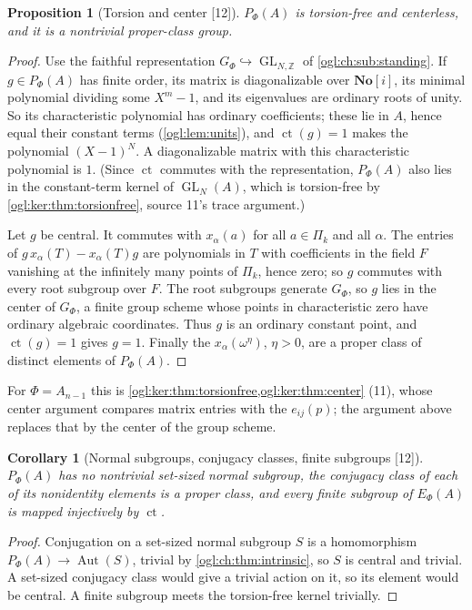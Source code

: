 \documentclass[11pt,oneside]{article}
\numberwithin{equation}{section}
\newtheorem{proposition}[proposition]{Proposition}
\newtheorem{corollary}[corollary]{Corollary}
\theoremstyle{definition}
\theoremstyle{remark}
\newcommand{\No}{\mathbf{No}}
\newcommand{\SC}{\No[i]}
\newcommand{\Z}{\mathbb Z}
\newcommand{\ct}{\operatorname{ct}}
\newcommand{\GL}{\operatorname{GL}}
\newcommand{\Aut}{\operatorname{Aut}}
\newcommand{\src}[1]{\textup{\textsf{\small[#1]}}}
\begin{document}
\begin{proposition}[Torsion and center \src{12}]\label{ogl:ch:prop:torsioncenter}
$P_\Phi(A)$ is torsion-free and centerless, and it is a nontrivial proper-class
group.
\end{proposition}
\begin{proof}
Use the faithful representation $G_\Phi\hookrightarrow\GL_{N,\Z}$ of
\cref{ogl:ch:sub:standing}. If $g\in P_\Phi(A)$ has finite order, its matrix is
diagonalizable over $\SC$, its minimal polynomial dividing some $X^m-1$, and its
eigenvalues are ordinary roots of unity. So its characteristic polynomial has
ordinary coefficients; these lie in $A$, hence equal their constant terms
(\cref{ogl:lem:units}), and $\ct(g)=1$ makes the polynomial $(X-1)^N$. A
diagonalizable matrix with this characteristic polynomial is $1$. (Since
$\ct$ commutes with the representation, $P_\Phi(A)$ also lies in the
constant-term kernel of $\GL_N(A)$, which is torsion-free by
\cref{ogl:ker:thm:torsionfree}, source 11's trace argument.)

Let $g$ be central. It commutes with $x_\alpha(a)$ for all $a\in\Pi_k$ and all
$\alpha$. The entries of $g\,x_\alpha(T)-x_\alpha(T)g$ are polynomials in $T$ with
coefficients in the field $F$ vanishing at the infinitely many points of
$\Pi_k$, hence zero; so $g$ commutes with every root subgroup over $F$. The
root subgroups generate $G_\Phi$, so $g$ lies in the center of $G_\Phi$, a finite
group scheme whose points in characteristic zero have ordinary algebraic
coordinates. Thus $g$ is an ordinary constant point, and $\ct(g)=1$ gives $g=1$.
Finally the $x_\alpha(\omega^\eta)$, $\eta>0$, are a proper class of distinct
elements of $P_\Phi(A)$.
\end{proof}

For $\Phi=A_{n-1}$ this is \cref{ogl:ker:thm:torsionfree,ogl:ker:thm:center}
(11), whose center argument compares matrix entries with the $e_{ij}(p)$; the
argument above replaces that by the center of the group scheme.

\begin{corollary}[Normal subgroups, conjugacy classes, finite subgroups \src{12}]\label{ogl:ch:cor:normalclasses}
$P_\Phi(A)$ has no nontrivial set-sized normal subgroup, the conjugacy class of
each of its nonidentity elements is a proper class, and every finite subgroup
of $E_\Phi(A)$ is mapped injectively by $\ct$.
\end{corollary}
\begin{proof}
Conjugation on a set-sized normal subgroup $S$ is a homomorphism
$P_\Phi(A)\to\Aut(S)$, trivial by \cref{ogl:ch:thm:intrinsic}, so $S$ is central
and trivial. A set-sized conjugacy class would give a trivial action on it, so
its element would be central. A finite subgroup meets the torsion-free kernel
trivially.
\end{proof}
\end{document}
